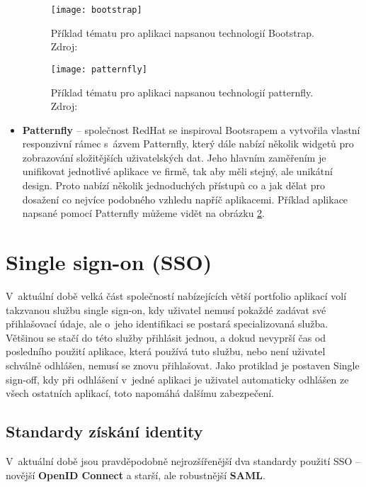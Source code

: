 \begin{itemize}
\begin{figure}[h!]
\centering
\texttt{[image: bootstrap]}
\caption[Příklad tématu pro aplikaci napsanou technologií Bootstrap]{Příklad tématu pro aplikaci napsanou technologií Bootstrap. Zdroj: \cite{bootstrap}}
\label{bootstrap-fig}
\end{figure}
\begin{figure}[h!]
\centering
\texttt{[image: patternfly]}
\caption[Příklad tématu pro aplikaci napsanou technologií Patternfly]{Příklad tématu pro aplikaci napsanou technologií patternfly. Zdroj: \cite{patternfly}}
\label{patternfly-fig}
\end{figure}
\newpage
\item \textbf{Patternfly} -- společnost RedHat se inspiroval Bootsrapem a vytvořila vlastní responzivní rámec s~ázvem Patternfly, který dále nabízí několik widgetů pro zobrazování složitějších uživatelských dat. Jeho hlavním zaměřením je unifikovat jednotlivé aplikace ve firmě, tak aby měli stejný, ale unikátní design. Proto nabízí několik jednoduchých přístupů co a jak dělat pro dosažení co nejvíce podobného vzhledu napříč aplikacemi. \cite{patternfly} Příklad aplikace napsané pomocí Patternfly můžeme vidět na obrázku \ref{patternfly-fig}.
\end{itemize}
\clearpage
\section{Single sign-on (SSO)}
\par V~aktuální době velká část společností nabízejících větší portfolio aplikací volí takzvanou službu single sign-on, kdy uživatel nemusí pokaždé zadávat své přihlašovací údaje, ale o~jeho identifikaci se postará specializovaná služba. Většinou se stačí do této služby přihlásit jednou, a dokud nevyprší čas od posledního použití aplikace, která používá tuto službu, nebo není uživatel schválně odhlášen, nemusí se znovu přihlašovat. Jako protiklad je postaven Single sign-off, kdy při odhlášení v~jedné aplikaci je uživatel automaticky odhlášen ze všech ostatních aplikací, toto napomáhá dalšímu zabezpečení.

\subsection{Standardy získání identity}
\par V~aktuální době jsou pravděpodobně nejrozšířenější dva standardy použití SSO -- novější \textbf{OpenID Connect} a starší, ale robustnější \textbf{SAML}.

